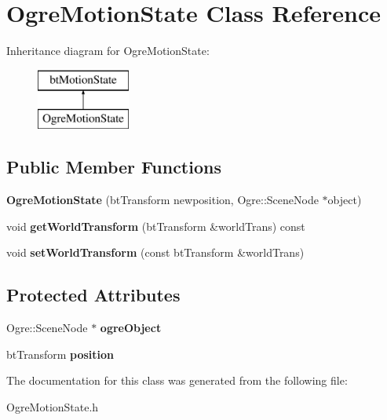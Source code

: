 \hypertarget{classOgreMotionState}{\section{Ogre\-Motion\-State Class Reference}
\label{classOgreMotionState}
}
Inheritance diagram for Ogre\-Motion\-State\-:\begin{figure}[H]
\begin{center}
\leavevmode
\includegraphics[height=2.000000cm]{classOgreMotionState}
\end{center}
\end{figure}
\subsection*{Public Member Functions}
\begin{DoxyCompactItemize}
\item 
\hypertarget{classOgreMotionState_ae162210352a5a02fc1fbdab71237db0d}{{\bfseries Ogre\-Motion\-State} (bt\-Transform newposition, Ogre\-::\-Scene\-Node $\ast$object)}\label{classOgreMotionState_ae162210352a5a02fc1fbdab71237db0d}

\item 
\hypertarget{classOgreMotionState_aad1bde58b7a70df4ac8a1eaa85f74c81}{void {\bfseries get\-World\-Transform} (bt\-Transform \&world\-Trans) const }\label{classOgreMotionState_aad1bde58b7a70df4ac8a1eaa85f74c81}

\item 
\hypertarget{classOgreMotionState_a1b923f3fb6eadf733bf3dcea718a36e0}{void {\bfseries set\-World\-Transform} (const bt\-Transform \&world\-Trans)}\label{classOgreMotionState_a1b923f3fb6eadf733bf3dcea718a36e0}

\end{DoxyCompactItemize}
\subsection*{Protected Attributes}
\begin{DoxyCompactItemize}
\item 
\hypertarget{classOgreMotionState_ae7dba01fecff53c68da9b17d63c9d504}{Ogre\-::\-Scene\-Node $\ast$ {\bfseries ogre\-Object}}\label{classOgreMotionState_ae7dba01fecff53c68da9b17d63c9d504}

\item 
\hypertarget{classOgreMotionState_a89f91947e958b56b14bfc5ee881e9f66}{bt\-Transform {\bfseries position}}\label{classOgreMotionState_a89f91947e958b56b14bfc5ee881e9f66}

\end{DoxyCompactItemize}


The documentation for this class was generated from the following file\-:\begin{DoxyCompactItemize}
\item 
Ogre\-Motion\-State.\-h\end{DoxyCompactItemize}
